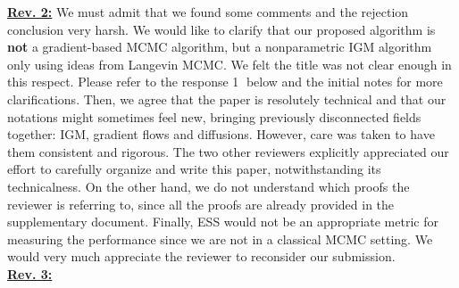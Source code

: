 \documentclass{article}
\newcommand{\rev}[1]{{\color{red} #1}}
\newcommand{\umut}[1]{{\color{blue} #1}}
\newcommand{\antoine}[1]{{\color{orange} #1}}
\newcommand{\ubul}[1]{{\large \color{red} \textcircled{\small #1}}}
\begin{document}
%
\textbf{\color{red} \underline{Rev. 2:}}
%
We must admit that we found some comments and the rejection conclusion very harsh. We would like to clarify that our proposed algorithm is \textbf{not} a gradient-based MCMC algorithm, but a nonparametric IGM algorithm only using ideas from Langevin MCMC. We felt the title was not clear enough in this respect. Please refer to the response \ubul{1} below and the initial notes for more clarifications.
%
Then, we agree that the paper is resolutely technical and that our notations might sometimes feel new, bringing previously disconnected fields together:  IGM, gradient flows and diffusions. However, care was taken to have them consistent and rigorous. The two other reviewers explicitly appreciated our effort to carefully organize and write this paper, notwithstanding its technicalness. On the other hand, we do not understand which proofs the reviewer is referring to, since all the proofs are already provided in the supplementary document. Finally, ESS would not be an appropriate metric for measuring the performance since we are not in a classical MCMC setting. We would very much appreciate the reviewer to reconsider our submission.\vspace{2pt} \\
%
%
\textbf{\color{red} \underline{Rev. 3:}}
\end{document}
